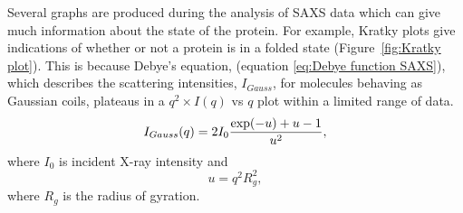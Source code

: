    Several graphs are produced during the analysis of SAXS data which can give much information about the state of the protein.
    For example, Kratky plots give indications of whether or not a protein is in a folded state (Figure~\ref{fig:Kratky plot}).
    This is because Debye's equation, (equation \ref{eq:Debye function SAXS}), which describes the scattering intensities, $I_{Gauss}$, for molecules behaving as Gaussian coils, plateaus in a $q^2 \times I(q)$ vs $q$ plot within a limited range of data.
    \begin{equation}
        I_{Gauss}(q) = 2 I_0 \frac{\exp(-u) + u -1}{u^2},
        \label{eq:Debye function SAXS}
    \end{equation}
    where $I_0$ is incident X-ray intensity and
    \begin{equation}
        u = q^2 R_g^2,
    \end{equation}
    where $R_g$ is the radius of gyration.

